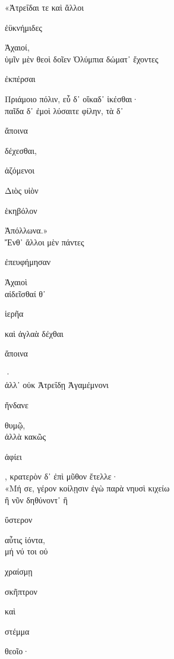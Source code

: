 \documentclass{ransom}
\begin{document}
\renewcommand{\rightheaderwhat}{\rightheaderwhatglosses}%
\begin{foreignpage}
\begin{graytext}
«Ἀτρεΐδαι τε καὶ ἄλλοι \begin{whitetext}ἐϋκνήμιδες\end{whitetext} Ἀχαιοί,\\
ὑμῖν μὲν θεοὶ δοῖεν Ὀλύμπια δώματ᾽ ἔχοντες\\
\begin{whitetext}ἐκπέρσαι\end{whitetext} Πριάμοιο πόλιν, εὖ δ᾽ οἴκαδ᾽ ἱκέσθαι·\\
παῖδα δ᾽ ἐμοὶ λύσαιτε φίλην, τὰ δ᾽ \begin{whitetext}ἄποινα\end{whitetext} δέχεσθαι,\hfill{}\\
\begin{whitetext}ἁζόμενοι\end{whitetext} Διὸς υἱὸν \begin{whitetext}ἑκηβόλον\end{whitetext} Ἀπόλλωνα.»\\
Ἔνθ᾽ ἄλλοι μὲν πάντες \begin{whitetext}ἐπευφήμησαν\end{whitetext} Ἀχαιοὶ\\
αἰδεῖσθαί θ᾽ \begin{whitetext}ἱερῆα\end{whitetext} καὶ ἀγλαὰ δέχθαι \begin{whitetext}ἄποινα\end{whitetext}·\\
ἀλλ᾽ οὐκ Ἀτρεΐδῃ Ἀγαμέμνονι \begin{whitetext}ἥνδανε\end{whitetext} θυμῷ,\\
ἀλλὰ κακῶς \begin{whitetext}ἀφίει\end{whitetext}, κρατερὸν δ᾽ ἐπὶ μῦθον ἔτελλε·\hfill{}\\
«Μή σε, γέρον κοίλῃσιν ἐγὼ παρὰ νηυσὶ κιχείω\\
ἢ νῦν δηθύνοντ᾽ ἢ \begin{whitetext}ὕστερον\end{whitetext} αὖτις ἰόντα,\\
μή νύ τοι οὐ \begin{whitetext}χραίσμῃ\end{whitetext} \begin{whitetext}σκῆπτρον\end{whitetext} καὶ \begin{whitetext}στέμμα\end{whitetext} θεοῖο·\\

\end{graytext}
\end{foreignpage}
\end{document}
